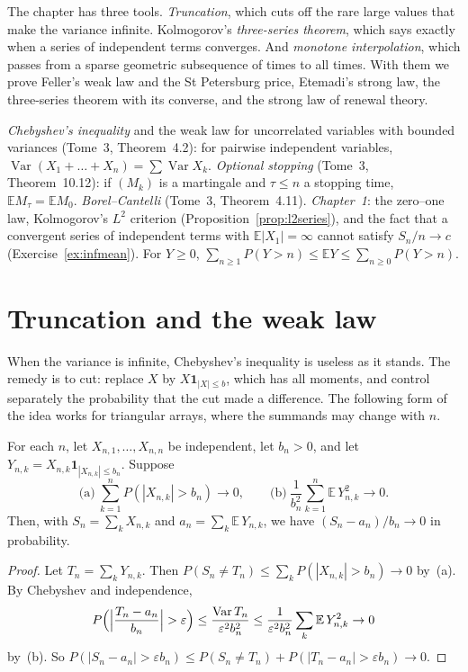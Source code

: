 The chapter has three tools. \emph{Truncation}, which cuts off the rare large values that make the variance infinite. Kolmogorov's
\emph{three-series theorem}, which says exactly when a series of independent terms converges. And \emph{monotone interpolation}, which
passes from a sparse geometric subsequence of times to all times. With them we prove Feller's weak law and the St Petersburg price,
Etemadi's strong law, the three-series theorem with its converse, and the strong law of renewal theory.

\begin{reminder}
\emph{Chebyshev's inequality} and the weak law for uncorrelated variables with bounded variances (Tome~3, Theorem~4.2): for pairwise independent
variables, $\operatorname{Var}(X_1+\dots+X_n)=\sum\operatorname{Var}X_k$. \emph{Optional stopping} (Tome~3, Theorem~10.12): if $(M_k)$ is a martingale and
$\tau\le n$ a stopping time, $\mathbb E M_\tau=\mathbb E M_0$. \emph{Borel--Cantelli} (Tome~3, Theorem~4.11). \emph{Chapter~1}: the zero--one law,
Kolmogorov's $L^2$ criterion (Proposition~\ref{prop:l2series}), and the fact that a convergent series of independent terms with
$\mathbb E|X_1|=\infty$ cannot satisfy $S_n/n\to c$ (Exercise~\ref{ex:infmean}). For $Y\ge0$, $\sum_{n\ge1}P(Y>n)\le\mathbb E Y\le\sum_{n\ge0}P(Y>n)$.
\end{reminder}

\section{Truncation and the weak law}

When the variance is infinite, Chebyshev's inequality is useless as it stands. The remedy is to cut: replace $X$ by $X\mathbf 1_{|X|\le b}$,
which has all moments, and control separately the probability that the cut made a difference. The following form of the idea works for
triangular arrays, where the summands may change with $n$.

\begin{theorem}\label{thm:wlltriangular}
For each $n$, let $X_{n,1},\dots,X_{n,n}$ be independent, let $b_n>0$, and let $Y_{n,k}=X_{n,k}\mathbf 1_{|X_{n,k}|\le b_n}$. Suppose
\[
\text{(a)}\ \sum_{k=1}^nP(|X_{n,k}|>b_n)\to0,\qquad\text{(b)}\ \frac1{b_n^2}\sum_{k=1}^n\mathbb E\,Y_{n,k}^2\to0.
\]
Then, with $S_n=\sum_kX_{n,k}$ and $a_n=\sum_k\mathbb E\,Y_{n,k}$, we have $(S_n-a_n)/b_n\to0$ in probability.
\end{theorem}
\begin{proof}
Let $T_n=\sum_kY_{n,k}$. Then $P(S_n\ne T_n)\le\sum_kP(|X_{n,k}|>b_n)\to0$ by~(a). By Chebyshev and independence,
\[
P\Bigl(\Bigl|\frac{T_n-a_n}{b_n}\Bigr|>\varepsilon\Bigr)\le\frac{\operatorname{Var}T_n}{\varepsilon^2b_n^2}\le\frac1{\varepsilon^2b_n^2}\sum_k\mathbb E\,Y_{n,k}^2\to0
\]
by~(b). So $P(|S_n-a_n|>\varepsilon b_n)\le P(S_n\ne T_n)+P(|T_n-a_n|>\varepsilon b_n)\to0$.
\end{proof}

